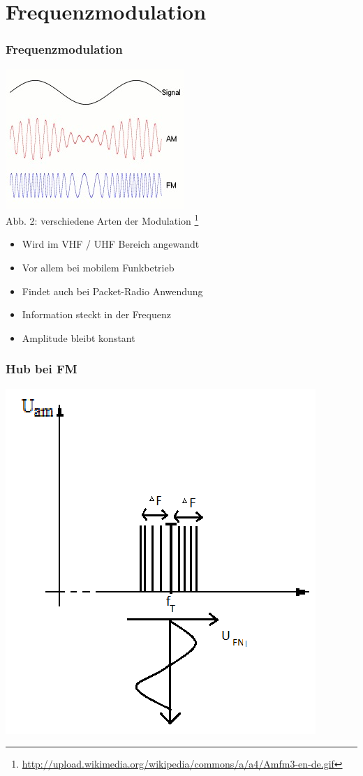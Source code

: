 \section*{Frequenzmodulation}
\begin{frame}
\frametitle{Frequenzmodulation}
	\begin{center}
\includegraphics[scale=0.8]{e14/modulationen.jpg}\\
	Abb. 2: verschiedene Arten der Modulation
	\footnote{\url{http://upload.wikimedia.org/wikipedia/commons/a/a4/Amfm3-en-de.gif}}\\
	\begin{itemize}
		\item Wird im VHF / UHF Bereich angewandt
		\item Vor allem bei mobilem Funkbetrieb
		\item Findet auch bei Packet-Radio Anwendung
		\item Information steckt in der Frequenz
		\item Amplitude bleibt konstant
	\end{itemize}
	\end{center}
\end{frame}

\begin{frame}
\frametitle{Hub bei FM}
\begin{center}
\includegraphics[scale=0.6]{e14/Hub.png}
\end{center}
\end{frame}

